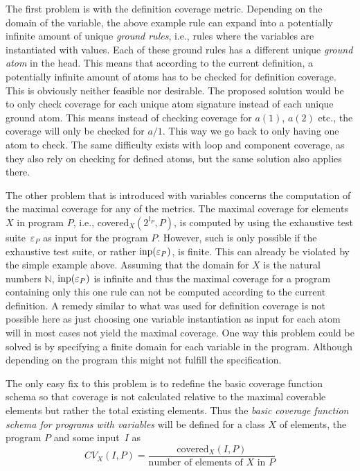 The first problem is with the definition coverage metric. Depending on the domain of the variable, the above example rule can expand into a potentially infinite amount of unique \emph{ground rules}, i.e., rules where the variables are instantiated with values. Each of these ground rules has a different unique \emph{ground atom} in the head. This means that according to the current definition, a potentially infinite amount of atoms has to be checked for definition coverage. This is obviously neither feasible nor desirable. The proposed solution would be to only check coverage for each unique atom signature instead of each unique ground atom. This means instead of checking coverage for $a(1)$, $a(2)$ etc., the coverage will only be checked for $a/1$. This way we go back to only having one atom to check. The same difficulty exists with loop and component coverage, as they also rely on checking for defined atoms, but the same solution also applies there.

The other problem that is introduced with variables concerns the computation of the maximal coverage for any of the metrics. The maximal coverage for elements $X$ in program $P$, i.e., covered$_X(2^{\mathbb{I}_P}, P)$, is computed by using the exhaustive test suite~\(\varepsilon_P\) as input for the program $P$. However, such is only possible if the exhaustive test suite, or rather \(\operatorname{inp}(\varepsilon_P)\), is finite. This can already be violated by the simple example above. Assuming that the domain for $X$ is the natural numbers $\mathbb{N}$, \(\operatorname{inp}(\varepsilon_P)\) is infinite and thus the maximal coverage for a program containing only this one rule can not be computed according to the current definition. A remedy similar to what was used for definition coverage is not possible here as just choosing one variable instantiation as input for each atom will in most cases not yield the maximal coverage. One way this problem could be solved is by specifying a finite domain for each variable in the program. Although depending on the program this might not fulfill the specification.

The only easy fix to this problem is to redefine the basic coverage function schema so that coverage is not calculated relative to the maximal coverable elements but rather the total existing elements. Thus the \emph{basic coverage function schema for programs with variables} will be defined for a class $X$ of elements, the program $P$ and some input~$I$ as
\begin{equation}
\label{eq:coverage function schema for variables}
    CV_X(I, P) = \frac{\text{covered}_X(I, P)}{\text{number of elements of $X$ in $P$}}
\end{equation}

